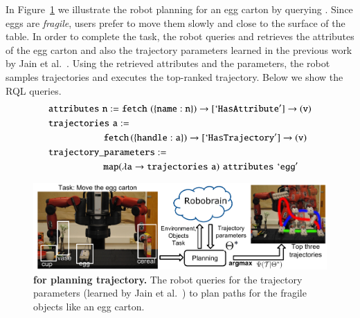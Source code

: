 In Figure~\ref{fig:planning} we illustrate the robot planning for an egg carton by querying \robobrain{}.
Since eggs are \textit{fragile}, users  prefer to move them slowly and close to the surface of the table.  In order to complete the task, the robot queries \robobrain{} and retrieves the attributes of the egg carton and also the trajectory parameters learned in the previous work by Jain et al.~\citep{Jain14}. Using the retrieved attributes and the parameters, the robot samples trajectories and executes the top-ranked trajectory.
Below we show the RQL queries.
{\small
\begin{align*}
&{\tt {attributes} \,\, n := fetch \,\,(\{name:n\})\rightarrow
[`HasAttribute'] \rightarrow (v)   \nonumber} \\
&{\tt {trajectories} \,\, a := }\\
&{\tt\hspace*{2cm} fetch \,(\{handle :a\})\rightarrow  [`HasTrajectory'] \rightarrow (v)  \nonumber } \\
&{\tt {trajectory\_parameters} := }\\
&{\tt \hspace*{2cm} map (\lambda a \rightarrow
{trajectories}\,\, a)  \,\, {attributes}\,\, `egg' } \nonumber
\end{align*}
}

\begin{figure}[t]
\centering
\includegraphics[width=\linewidth]{Image/planit_robobrain_pic_2}
\caption{\textbf{\robobrain{} for planning trajectory.} The robot queries \robobrain{} for the trajectory parameters (learned by Jain et al.~\citep{jainsaxena2013_trajectorypreferences})  to plan paths for the fragile objects like an egg carton. }
\label{fig:planning}
\end{figure}
